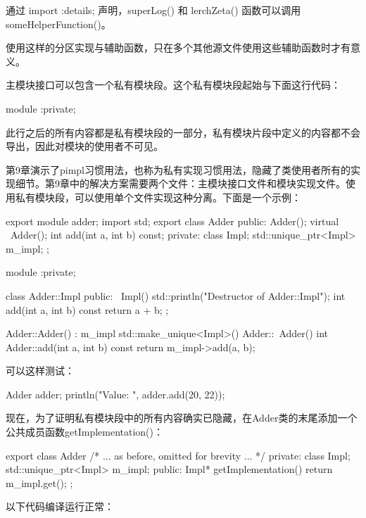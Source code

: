 通过 import :details; 声明，superLog() 和 lerchZeta() 函数可以调用 someHelperFunction()。

使用这样的分区实现与辅助函数，只在多个其他源文件使用这些辅助函数时才有意义。


主模块接口可以包含一个私有模块段。这个私有模块段起始与下面这行代码：

\begin{cpp}
module :private;
\end{cpp}

此行之后的所有内容都是私有模块段的一部分，私有模块片段中定义的内容都不会导出，因此对模块的使用者不可见。

第9章演示了pimpl习惯用法，也称为私有实现习惯用法，隐藏了类使用者所有的实现细节。第9章中的解决方案需要两个文件：主模块接口文件和模块实现文件。使用私有模块段，可以使用单个文件实现这种分离。下面是一个示例：

\begin{cpp}
export module adder;
import std;
export class Adder
{
    public:
        Adder();
        virtual ~Adder();
        int add(int a, int b) const;
    private:
        class Impl;
        std::unique_ptr<Impl> m_impl;
};

module :private;

class Adder::Impl
{
    public:
        ~Impl() { std::println("Destructor of Adder::Impl"); }
        int add(int a, int b) const { return a + b;}
};

Adder::Adder() : m_impl { std::make_unique<Impl>() } { }
Adder::~Adder() {}
int Adder::add(int a, int b) const { return m_impl->add(a, b); }
\end{cpp}

可以这样测试：

\begin{cpp}
Adder adder;
println("Value: {}", adder.add(20, 22));
\end{cpp}

现在，为了证明私有模块段中的所有内容确实已隐藏，在Adder类的末尾添加一个公共成员函数getImplementation()：

\begin{cpp}
export class Adder
{
    /* ... as before, omitted for brevity ... */
    private:
        class Impl;
        std::unique_ptr<Impl> m_impl;
    public:
        Impl* getImplementation() { return m_impl.get(); }
};
\end{cpp}

以下代码编译运行正常：

